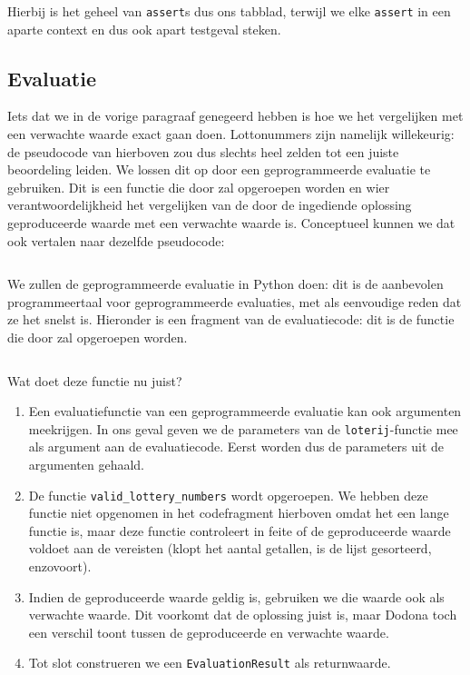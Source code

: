 Hierbij is het geheel van \texttt{assert}s dus ons tabblad, terwijl we elke \texttt{assert} in een aparte context en dus ook apart testgeval steken.

\subsection{Evaluatie}\label{subsec:oefening-lotto-evaluatie}

Iets dat we in de vorige paragraaf genegeerd hebben is hoe we het vergelijken met een verwachte waarde exact gaan doen.
Lottonummers zijn namelijk willekeurig: de pseudocode van hierboven zou dus slechts heel zelden tot een juiste beoordeling leiden.
We lossen dit op door een geprogrammeerde evaluatie te gebruiken.
Dit is een functie die door \tested{} zal opgeroepen worden en wier verantwoordelijkheid het vergelijken van de door de ingediende oplossing geproduceerde waarde met een verwachte waarde is.
Conceptueel kunnen we dat ook vertalen naar dezelfde pseudocode:

\inputminted{python}{code/lotto-eval-programmed.py}

We zullen de geprogrammeerde evaluatie in Python doen: dit is de aanbevolen programmeertaal voor geprogrammeerde evaluaties, met als eenvoudige reden dat ze het snelst is.
Hieronder is een fragment van de evaluatiecode: dit is de functie die door \tested{} zal opgeroepen worden.

\inputminted[firstline=42,lastline=49]{python}{sources/lotto-evaluator.py}

Wat doet deze functie nu juist?

\begin{enumerate}
    \item Een evaluatiefunctie van een geprogrammeerde evaluatie kan ook argumenten meekrijgen.
    In ons geval geven we de parameters van de \texttt{loterij}-functie mee als argument aan de evaluatiecode.
    Eerst worden dus de parameters uit de argumenten gehaald.
    \item De functie \texttt{valid\_lottery\_numbers} wordt opgeroepen.
    We hebben deze functie niet opgenomen in het codefragment hierboven omdat het een lange functie is, maar deze functie controleert in feite of de geproduceerde waarde voldoet aan de vereisten (klopt het aantal getallen, is de lijst gesorteerd, enzovoort).
    \item Indien de geproduceerde waarde geldig is, gebruiken we die waarde ook als verwachte waarde.
    Dit voorkomt dat de oplossing juist is, maar Dodona toch een verschil toont tussen de geproduceerde en verwachte waarde.
    \item Tot slot construeren we een \texttt{EvaluationResult} als returnwaarde.
\end{enumerate}

